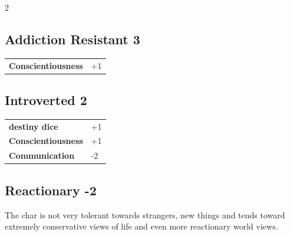 \begin{multicols}{2}
\begin{tcolorbox}

\end{tcolorbox}

\begin{tcolorbox}
    \subsection*{Addiction Resistant \hfill \small{3 }}
    \tcblower




\begin{tabular}{@{}ll@{}}
    \textbf{Conscientiousness} & +1\\
\end{tabular}


\end{tcolorbox}

\begin{tcolorbox}
    \subsection*{Introverted \hfill \small{2 }}
    \tcblower




\begin{tabular}{@{}ll@{}}
    \textbf{destiny dice} & +1\\
    \textbf{Conscientiousness} & +1\\
    \textbf{Communication} & -2\\
\end{tabular}


\end{tcolorbox}

\begin{tcolorbox}
    \subsection*{Reactionary \hfill \small{-2 }}
    \tcblower
The char is not very tolerant towards strangers, new things and tends toward extremely conservative views of life and even more reactionary world views.



\end{tcolorbox}
\end{multicols}
